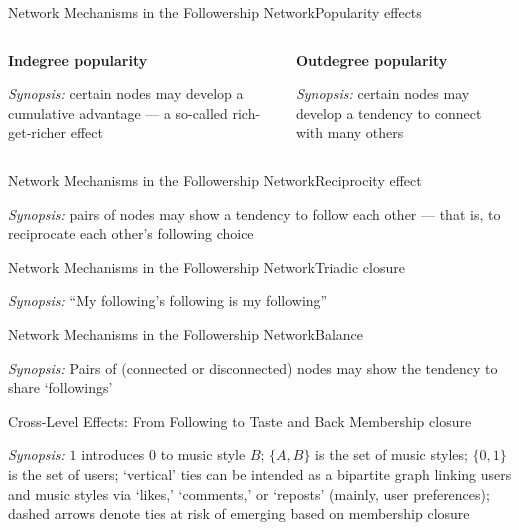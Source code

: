\documentclass[notes, aspectratio=1610]{beamer}
\begin{document}
\begin{frame}{Network Mechanisms in the Followership Network}{Popularity effects}
	\begin{columns}[t]
		\begin{column}{0.5\textwidth}
			\centering 
			\textbf{Indegree popularity}
			
			

			\raggedright
			\small
			\textit{Synopsis:} certain nodes may develop a cumulative 
			advantage --- a so-called rich-get-richer effect
		\end{column}
		\begin{column}{0.5\textwidth}
			\centering 
			\textbf{Outdegree popularity}
			
			

			\raggedright
			\small
			\textit{Synopsis:} certain nodes may develop a tendency 
			to connect with many others
		\end{column}
	\end{columns}
\end{frame}

\begin{frame}{Network Mechanisms in the Followership Network}{Reciprocity effect}
	\centering 
	

	\raggedright
	\small 
	\textit{Synopsis:} pairs of nodes may show a tendency to follow each 
	other --- that is, to reciprocate each other's following choice 
\end{frame}

\begin{frame}{Network Mechanisms in the Followership Network}{Triadic closure}
	\centering 
	

	\small
	\textit{Synopsis:} ``My following's following is my following'' 
\end{frame}

\begin{frame}{Network Mechanisms in the Followership Network}{Balance}
	\centering 
	

	\small 
	\textit{Synopsis:} Pairs of (connected or disconnected) nodes may 
	show the tendency to share `followings'
\end{frame}

\begin{frame}{Cross-Level Effects: From Following to Taste and Back}
	{Membership closure}
	\centering
	

	\raggedright
	\small 
	\textit{Synopsis:} $1$ introduces $0$ to music style $B$;
        $\{A, B\}$ is the set of music styles; $\{0, 1\}$ is
	the set of users; `vertical' ties can be intended as a bipartite 
	graph linking users and music styles via `likes,' `comments,' or
	`reposts' (mainly, user preferences); dashed arrows denote ties 
	at risk of emerging based on membership closure
\end{frame}
\end{document}
